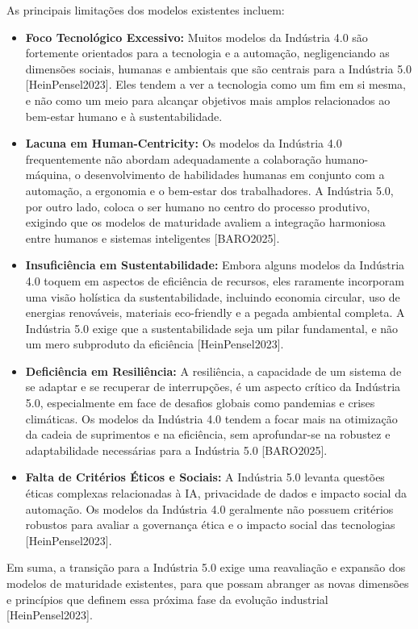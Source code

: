 As principais limitações dos modelos existentes incluem:
\begin{itemize}
    \item \textbf{Foco Tecnológico Excessivo:} Muitos modelos da Indústria 4.0 são fortemente orientados para a tecnologia e a automação, negligenciando as dimensões sociais, humanas e ambientais que são centrais para a Indústria 5.0 [HeinPensel2023]. Eles tendem a ver a tecnologia como um fim em si mesma, e não como um meio para alcançar objetivos mais amplos relacionados ao bem-estar humano e à sustentabilidade.
    \item \textbf{Lacuna em Human-Centricity:} Os modelos da Indústria 4.0 frequentemente não abordam adequadamente a colaboração humano-máquina, o desenvolvimento de habilidades humanas em conjunto com a automação, a ergonomia e o bem-estar dos trabalhadores. A Indústria 5.0, por outro lado, coloca o ser humano no centro do processo produtivo, exigindo que os modelos de maturidade avaliem a integração harmoniosa entre humanos e sistemas inteligentes [BARO2025].
    \item \textbf{Insuficiência em Sustentabilidade:} Embora alguns modelos da Indústria 4.0 toquem em aspectos de eficiência de recursos, eles raramente incorporam uma visão holística da sustentabilidade, incluindo economia circular, uso de energias renováveis, materiais eco-friendly e a pegada ambiental completa. A Indústria 5.0 exige que a sustentabilidade seja um pilar fundamental, e não um mero subproduto da eficiência [HeinPensel2023].
    \item \textbf{Deficiência em Resiliência:} A resiliência, a capacidade de um sistema de se adaptar e se recuperar de interrupções, é um aspecto crítico da Indústria 5.0, especialmente em face de desafios globais como pandemias e crises climáticas. Os modelos da Indústria 4.0 tendem a focar mais na otimização da cadeia de suprimentos e na eficiência, sem aprofundar-se na robustez e adaptabilidade necessárias para a Indústria 5.0 [BARO2025].
    \item \textbf{Falta de Critérios Éticos e Sociais:} A Indústria 5.0 levanta questões éticas complexas relacionadas à IA, privacidade de dados e impacto social da automação. Os modelos da Indústria 4.0 geralmente não possuem critérios robustos para avaliar a governança ética e o impacto social das tecnologias [HeinPensel2023].
\end{itemize}

Em suma, a transição para a Indústria 5.0 exige uma reavaliação e expansão dos modelos de maturidade existentes, para que possam abranger as novas dimensões e princípios que definem essa próxima fase da evolução industrial [HeinPensel2023].





